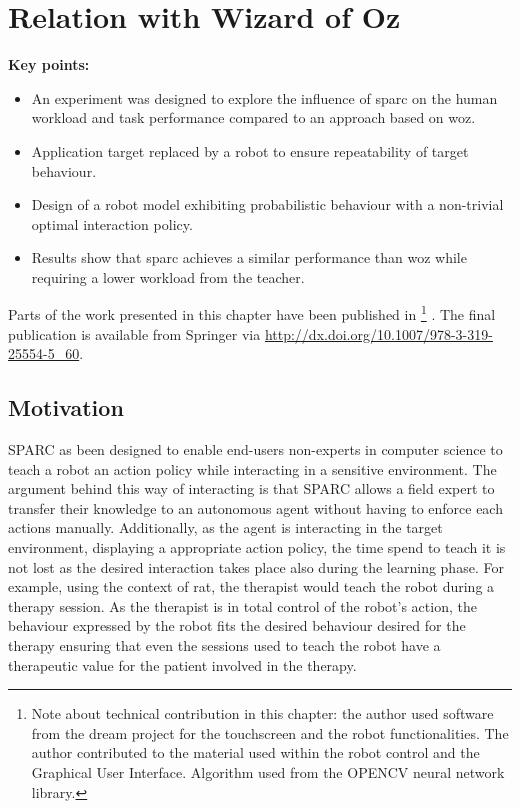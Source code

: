 \chapter{Relation with Wizard of Oz}\label{chap:woz}

\graphicspath{{images/woz/}}

\begin{framed}
	\textbf{Key points:}
	
	\begin{itemize}
		\item An experiment was designed to explore the influence of \gls{sparc} on the human workload and task performance compared to an approach based on \gls{woz}.
		\item Application target replaced by a robot to ensure repeatability of target behaviour.
		\item Design of a robot model exhibiting probabilistic behaviour with a non-trivial optimal interaction policy.
		\item Results show that \gls{sparc} achieves a similar performance than \gls{woz} while requiring a lower workload from the teacher.
	\end{itemize}
\end{framed}

Parts of the work presented in this chapter have been published in \cite{senft2015sparc} \footnote{Note about technical contribution in this chapter: the author used software from the \gls{dream} project for the touchscreen and the robot functionalities. The author contributed to the material used within the robot control and the Graphical User Interface. Algorithm used from the OPENCV neural network library.} . The final publication is available from Springer via \url{http://dx.doi.org/10.1007/978-3-319-25554-5_60}.

\newpage

\section{Motivation}

SPARC as been designed to enable end-users non-experts in computer science to teach a robot an action policy while interacting in a sensitive environment. The argument behind this way of interacting is that SPARC allows a field expert to transfer their knowledge to an autonomous agent without having to enforce each actions manually. Additionally, as the agent is interacting in the target environment, displaying a appropriate action policy, the time spend to teach it is not lost as the desired interaction takes place also during the learning phase. For example, using the context of \gls{rat}, the therapist would teach the robot during a therapy session. As the therapist is in total control of the robot's action, the behaviour expressed by the robot fits the desired behaviour desired for the therapy ensuring that even the sessions used to teach the robot have a therapeutic value for the patient involved in the therapy.

